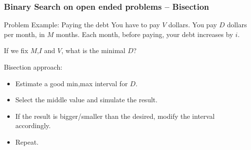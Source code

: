 \documentclass{beamer}
\begin{document}
\begin{frame}
  \frametitle{Binary Search on open ended problems -- Bisection}
  \begin{block}{Problem Example: Paying the debt}
    You have to pay $V$ dollars. You pay $D$ dollars per month, in $M$
    months. Each month, before paying, your debt increases by $i$. 

    \medskip

    If we fix $M$,$I$ and $V$, what is the minimal $D$?
  \end{block}

  Bisection approach:
  \begin{itemize}
  \item Estimate a good min,max interval for $D$.
  \item Select the middle value and simulate the result.
  \item If the result is bigger/smaller than the desired, modify the
    interval accordingly.
  \item Repeat.
  \end{itemize}
\end{frame}
\end{document}
